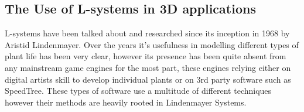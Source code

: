 \FloatBarrier

\subsection{The Use of L-systems in 3D applications}

\begin{flushleft}

L-systems have been talked about and researched since its inception in 1968 by Aristid Lindenmayer. Over the years it's usefulness in modelling different types of plant life has been very clear, however its presence has been quite absent from any mainstream game engines for the most part, these engines relying either on digital artists skill to develop individual plants or on 3rd party software such as SpeedTree. These types of software use a multitude of different techniques however their methods are heavily rooted in Lindenmayer Systems. 

\end{flushleft}
